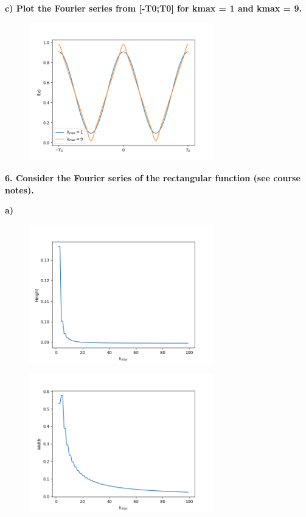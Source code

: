 \textbf{c) Plot the Fourier series from [-T0;T0] for kmax = 1 and kmax = 9.}
\\



\begin{figure}[H]
	\includegraphics[width=8cm]{img/ex_5_c.png}
	\centering
\end{figure}

\textbf{6. Consider the Fourier series of the rectangular function (see course notes).}

\textbf{a)}



\begin{figure}[H]
	\includegraphics[width=8cm]{img/ex_6_a.png}
	\centering
\end{figure}



\begin{figure}[H]
	\includegraphics[width=8cm]{img/ex_6_b.png}
	\centering
\end{figure}




